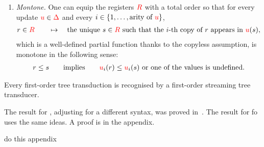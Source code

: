 \begin{definition}
\begin{itemize}
\begin{enumerate}
        \item \emph{Montone.} One can equip the registers ${{\color{red}{R}}}$ with a total order so that for every update ${\color{red}{u}} \in {\color{red}{\Delta}}$ and  every $i \in \{1,\ldots,\text{arity of ${\color{red}{u}}$}\}$,
        \begin{align*}
            r \in {{\color{red}{R}}} \qquad \mapsto \quad \text{the unique $s \in {{\color{red}{R}}}$ such that the $i$-th copy of $r$ appears in ${\color{red}{u}}(s)$},
        \end{align*}
        which is a well-defined partial function thanks to the copyless assumption, is monotone in the following sense:
        \begin{align*}
            r \leq s \qquad \text{implies} \qquad  {\color{red}{u}}_i(r) \le  {\color{red}{u}}_i(s) \text{ or one of the values is undefined.}
        \end{align*}
    \end{enumerate}
    \end{itemize}
    
\end{definition}


\begin{proposition}\label{prop:stt}
    Every first-order tree transduction is recognised by a first-order streaming tree transducer. 
\end{proposition}

The result for \mso, adjusting for a different syntax,  was proved in~\cite[Theorem 4.6]{alur2017streaming}. The result for fo uses the same ideas. A proof is in the appendix.
\begin{center}
    do this appendix 
\end{center}





